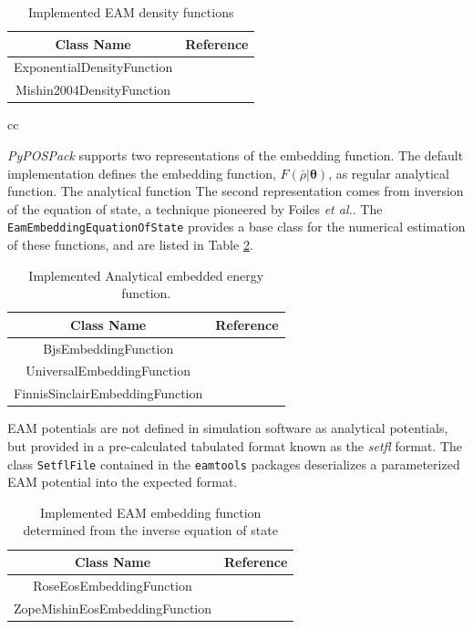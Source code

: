 \begin{table}[ht]
	\centering
	\caption{Implemented EAM density functions}
	\begin{tabular}{cc}
		\hline
		{Class Name} & {Reference} \\
		\hline
		ExponentialDensityFunction & \\
		Mishin2004DensityFunction & \cite{mishin2004_eam_NiAl} \\
		\hline
	\end{tabular}{cc}
\end{table}

\emph{PyPOSPack} supports two representations of the embedding function.  The default implementation defines the embedding function, $F(\bar{\rho}|\bm{\theta})$, as regular analytical function.  The analytical function The second representation comes from inversion of the equation of state, a technique pioneered by Foiles \emph{et al.}\cite{foiles1986_eam_embedded_eos}.  The \verb|EamEmbeddingEquationOfState| provides a base class for the numerical estimation of these functions, and are listed in Table \ref{tbl:pypospack_eos_embedding_function}.
\begin{table}[ht]
	\centering
	\caption{Implemented Analytical embedded energy function.}
	\label{tbl:pypospack_embedding_function}
	\begin{tabular}{cc}
		\hline
		{Class Name} & Reference \\
		\hline
		BjsEmbeddingFunction & \\
		UniversalEmbeddingFunction & \\
		FinnisSinclairEmbeddingFunction & \\
		\hline
	\end{tabular}
\end{table}

EAM potentials are not defined in simulation software as analytical potentials, but provided in a pre-calculated tabulated format known as the \emph{setfl} format.  The class \verb|SetflFile| contained in the \verb|eamtools| packages deserializes a parameterized EAM potential into the expected format.

\begin{table}[ht]
	\centering
	\caption{Implemented EAM embedding function determined from the inverse equation of state}
	\label{tbl:pypospack_eos_embedding_function}
	\begin{tabular}{cc}
		\hline
		{Class Name} & {Reference} \\
		\hline
		RoseEosEmbeddingFunction & \cite{foiles1984_eam_eos} \\
		ZopeMishinEosEmbeddingFunction & \cite{zope2003_eam_eos} \\
		\hline
	\end{tabular}
\end{table}




